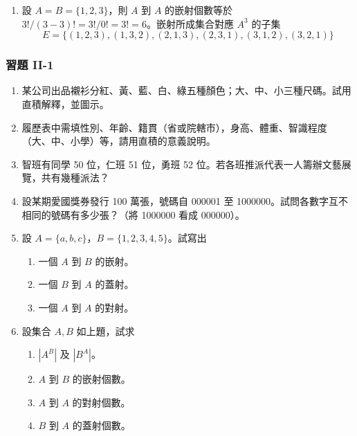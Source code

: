 \begin{example}
\begin{enumerate}[label=(\roman*), topsep=2pt, itemsep=4pt]
\begin{figure}[H]
\caption*{圖 2-2}
\label{fig:b5s-2-2}
\end{figure}

  \item 設 $A = B = \{1, 2, 3\}$，則 $A$ 到 $A$ 的嵌射個數等於 $3!/(3-3)! = 3!/0! = 3! = 6$。嵌射所成集合對應 $A^3$ 的子集
\[
E = \{(1, 2, 3), (1, 3, 2), (2, 1, 3), (2, 3, 1), (3, 1, 2), (3, 2, 1)\}
\]
\end{enumerate}
\end{example}

\subsubsection*{習題 II-1}\label{sec:b5s-ex2-1}

\begin{enumerate}[label=\textbf{\arabic*.}]
  \item 某公司出品襯衫分紅、黃、藍、白、綠五種顏色；大、中、小三種尺碼。試用直積解釋，並圖示。
  \item 履歷表中需填性別、年齡、籍貫（省或院轄市），身高、體重、智識程度（大、中、小學）等，請用直積的意義說明。
  \item 智班有同學 50 位，仁班 51 位，勇班 52 位。若各班推派代表一人籌辦文藝展覽，共有幾種派法？
  \item 設某期愛國獎券發行 100 萬張，號碼自 000001 至 1000000。試問各數字互不相同的號碼有多少張？（將 1000000 看成 000000）。
  \item 設 $A = \{a, b, c\}$，$B = \{1, 2, 3, 4, 5\}$。試寫出
  \begin{enumerate}[label=(\arabic*)]
    \item 一個 $A$ 到 $B$ 的嵌射。
    \item 一個 $B$ 到 $A$ 的蓋射。
    \item 一個 $A$ 到 $A$ 的對射。
  \end{enumerate}
  \item 設集合 $A, B$ 如上題，試求
  \begin{enumerate}[label=(\arabic*)]
    \item $|A^B|$ 及 $|B^A|$。
    \item $A$ 到 $B$ 的嵌射個數。
    \item $A$ 到 $A$ 的對射個數。
    \item $B$ 到 $A$ 的蓋射個數。
  \end{enumerate}
\end{enumerate}

